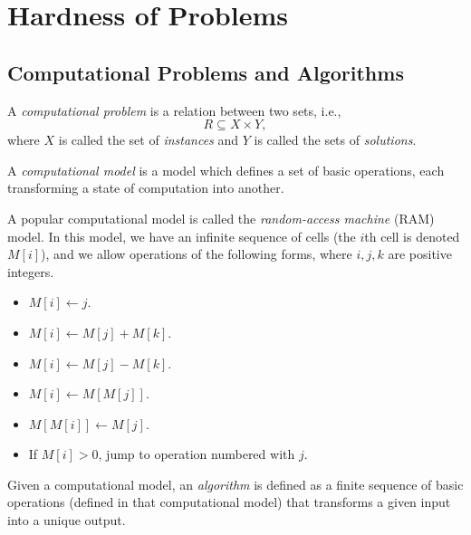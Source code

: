 \chapter{Hardness of Problems}
\section{Computational Problems and Algorithms}
\begin{definition}
  A \emph{computational problem} is a relation between two sets, i.e.,
  \begin{equation*}
    R \subseteq X \times Y,
  \end{equation*}
  where $X$ is called the set of \emph{instances} and $Y$ is called the sets of
  \emph{solutions}. 
\end{definition}

\begin{definition}
  A \emph{computational model} is a model which defines a set of basic
  operations, each transforming a state of computation into another.
\end{definition}

\begin{example}
  A popular computational model is called the \emph{random-access machine}
  (RAM) model.
  In this model, we have an infinite sequence of cells (the $i$th cell is
  denoted $M[i]$), and we allow operations of the following forms, where
  $i, j, k$ are positive integers.
  \begin{itemize}
    \item $M[i] \gets j$.
    \item $M[i] \gets M[j] + M[k]$.
    \item $M[i] \gets M[j] - M[k]$.
    \item $M[i] \gets M[M[j]]$.
    \item $M[M[i]] \gets M[j]$.
    \item If $M[i] > 0$, jump to operation numbered with $j$.
  \end{itemize}
\end{example}

\begin{definition}
  Given a computational model, an \emph{algorithm} is defined as a finite
  sequence of basic operations (defined in that computational model) that
  transforms a given input into a unique output.
\end{definition}